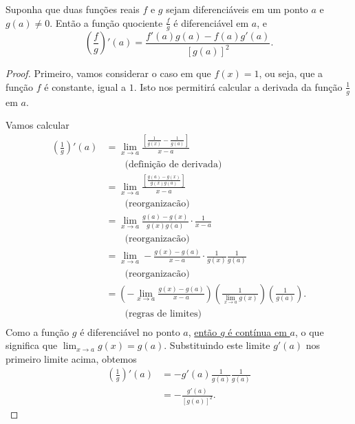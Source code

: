 \begin{theorem}
	Suponha que duas funções reais $f$ e $g$ sejam diferenciáveis em um ponto $a$ e $g(a)\neq 0$. Então a função quociente $\frac{f}{g}$ é diferenciável em $a$, e
	\[\left(\frac{f}{g}\right)'(a)=\frac{f'(a)g(a)-f(a)g'(a)}{[g(a)]^2}.\]
\end{theorem}

\begin{proof}
	Primeiro, vamos considerar o caso em que $f(x)=1$, ou seja, que a função $f$ é constante, igual a $1$. Isto nos permitirá calcular a derivada da função $\frac{1}{g}$ em $a$.
	
	Vamos calcular
	\begin{align*}
		\left(\frac{1}{g}\right)'(a)
			&=\lim_{x\to a}\frac{\left[\frac{1}{g(x)}-\frac{1}{g(a)}\right]}{x-a}\\
			&\qquad\text{(definição de derivada)}\\
			&=\lim_{x\to a}\frac{\left[\frac{g(a)-g(x)}{g(x)g(a)}\right]}{x-a}\\
			&\qquad\text{(reorganizacão)}\\
			&=\lim_{x\to a}\frac{g(a)-g(x)}{g(x)g(a)}\cdot\frac{1}{x-a}\\
			&\qquad\text{(reorganizacão)}\\
			&=\lim_{x\to a}-\frac{g(x)-g(a)}{x-a}\cdot\frac{1}{g(x)}\frac{1}{g(a)}\\
			&\qquad\text{(reorganizacão)}\\
			&=\left(-\lim_{x\to a}\frac{g(x)-g(a)}{x-a}\right)\left(\frac{1}{\lim_{x\to a}g(x)}\right)\left(\frac{1}{g(a)}\right).\\
			&\qquad\text{(regras de limites)}\\
	\end{align*}
	Como a função $g$ é diferenciável no ponto $a$, \href{../09.derivadas/teo_funcoes_derivaveis_sao_continuas_moodle.html}{então $g$ é contínua em $a$}, o que significa que $\lim_{x\to a}g(x)=g(a)$. Substituindo este limite $g'(a)$ nos primeiro limite acima, obtemos
	\begin{align*}
		\left(\frac{1}{g}\right)'(a)
			&=-g'(a)\frac{1}{g(a)}\frac{1}{g(a)}\\
			&=-\frac{g'(a)}{[g(a)]^2}.\tag{$*$}
	\end{align*}
	

\end{proof}
